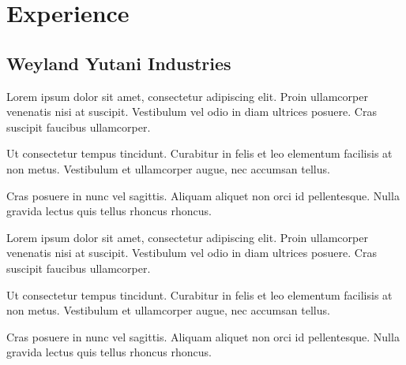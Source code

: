 \documentclass{stationery-resume}
\begin{document}
\lastupdated
%
%



%
%

\begin{minipage}[t]{0.70\textwidth} 

\section{Experience}
\subsection{Weyland Yutani Industries}
\vspace{\topsep} %
\begin{tightemize}
\sectionsep
\item Lorem ipsum dolor sit amet, consectetur adipiscing elit. Proin ullamcorper venenatis nisi at suscipit. Vestibulum vel odio in diam ultrices posuere. Cras suscipit faucibus ullamcorper.
\item Ut consectetur tempus tincidunt. Curabitur in felis et leo elementum facilisis at non metus. Vestibulum et ullamcorper augue, nec accumsan tellus. \item Cras posuere in nunc vel sagittis. Aliquam aliquet non orci id pellentesque. Nulla gravida lectus quis tellus rhoncus rhoncus.  
\end{tightemize}
\sectionsep

\begin{tightemize}
\sectionsep
\item Lorem ipsum dolor sit amet, consectetur adipiscing elit. Proin ullamcorper venenatis nisi at suscipit. Vestibulum vel odio in diam ultrices posuere. Cras suscipit faucibus ullamcorper.
\item Ut consectetur tempus tincidunt. Curabitur in felis et leo elementum facilisis at non metus. Vestibulum et ullamcorper augue, nec accumsan tellus.
\item Cras posuere in nunc vel sagittis. Aliquam aliquet non orci id pellentesque. Nulla gravida lectus quis tellus rhoncus rhoncus.
\end{tightemize}
\sectionsep


\end{minipage}
\end{document}
